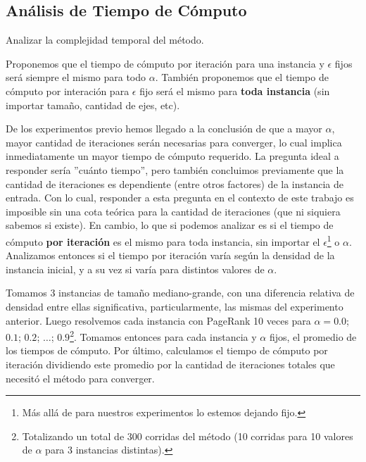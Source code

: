 \subsection{An\'alisis de Tiempo de C\'omputo}
\label{subsec:exp4}
\begin{LaTeXdescription}
    \item[Objetivo] Analizar la complejidad temporal del m\'etodo.

    \item[Hip\'otesis] Proponemos que el tiempo de c\'omputo por iteraci\'on
        para una instancia y $\epsilon$ fijos ser\'a siempre el mismo para todo
        $\alpha$. Tambi\'en proponemos que el tiempo de c\'omputo por interación
        para $\epsilon$ fijo ser\'a el mismo para \textbf{toda instancia} (sin
        importar tama\~no, cantidad de ejes, etc).

    \item[Proposici\'on] De los experimentos previo hemos llegado a la
        conclusi\'on de que a mayor $\alpha$, mayor cantidad de iteraciones
        ser\'an necesarias para converger, lo cual implica inmediatamente un mayor tiempo
        de c\'omputo requerido. La pregunta ideal a responder ser\'ia ''cu\'anto
        tiempo'', pero
        tambi\'en concluimos previamente que la cantidad de iteraciones es
        dependiente (entre otros factores) de la instancia de entrada. Con lo
        cual, responder a esta pregunta en el contexto de este trabajo es
        imposible sin una cota te\'orica para la cantidad de
        iteraciones (que ni siquiera sabemos si existe). En cambio, lo que si podemos analizar es
        si el tiempo de c\'omputo \textbf{por iteraci\'on} es el mismo para toda
        instancia, sin importar el $\epsilon$\footnote{M\'as all\'a de para nuestros
        experimentos lo estemos dejando fijo.} o $\alpha$. Analizamos entonces
        si el tiempo por iteraci\'on var\'ia seg\'un
        la densidad de la instancia inicial, y a su vez si varía para distintos
        valores de $\alpha$.

    \item[M\'etodo de Experimentaci\'on] Tomamos 3 instancias de tama\~no
        mediano-grande, con una diferencia relativa de densidad entre ellas
        significativa, particularmente, las mismas del experimento anterior. Luego resolvemos cada instancia con PageRank 10 veces
        para $\alpha=0.0$; $0.1$; $0.2$; $\dots$; $0.9$\footnote{Totalizando un total de 300
        corridas del m\'etodo (10 corridas para 10 valores de $\alpha$ para 3
        instancias distintas).}.  Tomamos entonces para cada instancia y
        $\alpha$ fijos, el promedio de los tiempos de c\'omputo. Por \'ultimo,
        calculamos el tiempo de c\'omputo por iteraci\'on dividiendo este
        promedio por la cantidad de iteraciones totales que necesit\'o el
        m\'etodo para converger.


\end{LaTeXdescription}
